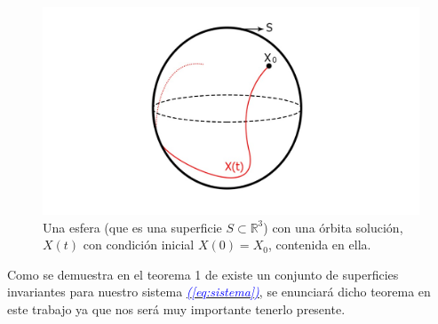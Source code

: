 \documentclass[12pt,a4paper]{report} %
\newcommand{\eref}[1]{\hyperref[#1]{\textcolor{blue}{\textit{(\ref*{#1})}}}}
\begin{document}
	\begin{figure}[h]
		\centering
		\includegraphics[width=1\textwidth]{esfera.jpg}
		\caption{Una esfera (que es una superficie $S\subset \mathbb{R}^3$) con una órbita solución, $X(t)$ con condición inicial $X(0)=X_0$, contenida en ella.}
		\label{fig:esfera}
	\end{figure}\smallskip
	\newpage
	
	Como se demuestra en el teorema 1 de \cite{ponce} existe un conjunto de superficies invariantes para nuestro sistema \eref{eq:sistema}, se enunciará dicho teorema en este trabajo ya que nos será muy importante tenerlo presente.
	
\end{document}
